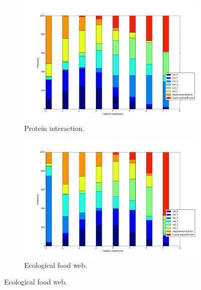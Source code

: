 \documentclass{article}
\begin{document}
\begin{figure}[H]
\begin{subfigure}{0.48\textwidth}
\includegraphics[width=\linewidth]{figs/one_by_many/protein/feature_importance.png}
\caption{Protein interaction.} \label{protein_feature}
\end{subfigure}\hspace*{\fill}
\begin{subfigure}{0.48\textwidth}
\includegraphics[width=\linewidth]{figs/one_by_many/food_web/feature_importance.png}
\caption{Ecological food web.} \label{foodweb_feature}
\end{subfigure}


\end{figure}
\end{document}
